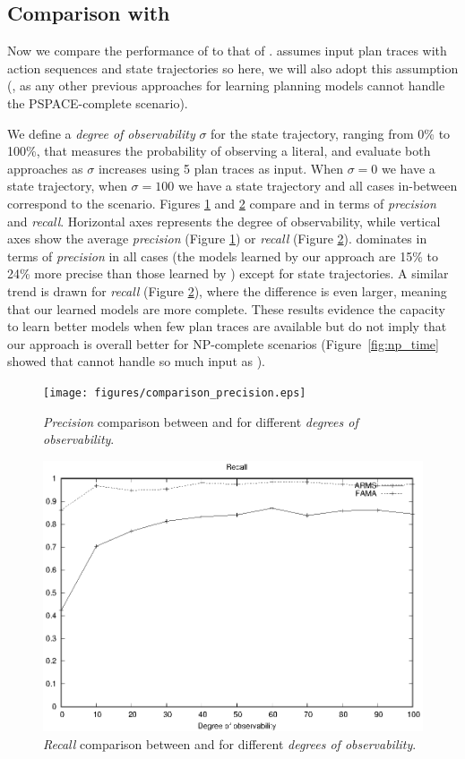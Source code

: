 \subsection{Comparison with \ARMS}
Now we compare the performance of \FAMA to that of \ARMS. \ARMS assumes input plan traces with \FO action sequences and \NO state trajectories so here, we will also adopt this assumption (\ARMS, as any other previous approaches for learning planning models cannot handle the PSPACE-complete scenario).

We define a \emph{degree of observability} $\sigma$ for the state trajectory, ranging from 0\% to 100\%, that measures the probability of observing a literal, and evaluate both approaches as $\sigma$ increases using 5 plan traces as input. When $\sigma = 0$ we have a \NO state trajectory, when $\sigma=100$ we have a \FO state trajectory and all cases in-between correspond to the \PO scenario. Figures \ref{fig:comparison_precision} and \ref{fig:comparison_recall} compare \FAMA and \ARMS in terms of {\em precision} and {\em recall}. Horizontal axes represents the degree of observability, while vertical axes show the average {\em precision} (Figure \ref{fig:comparison_precision}) or {\em recall} (Figure \ref{fig:comparison_recall}). \FAMA dominates in terms of {\em precision} in all cases (the models learned by our approach are 15\% to 24\% more precise than those learned by \ARMS) except for \FO state trajectories. A similar trend is drawn for {\em recall} (Figure \ref{fig:comparison_recall}), where the difference is even larger, meaning that our learned models are more complete. These results evidence the \FAMA capacity to learn better models when few plan traces are available but do not imply that our approach is overall better for NP-complete scenarios (Figure~\ref{fig:np_time} showed that \FAMA cannot handle so much input as \ARMS).



\begin{figure}[hbt!]
	\centering
	\texttt{[image: figures/comparison\_precision.eps]}
	\caption{{\em Precision} comparison between \FAMA and \ARMS for different \emph{degrees of observability}.}
	\label{fig:comparison_precision}
\end{figure}

\begin{figure}[hbt!]
	\centering
	\includegraphics[width=.65\linewidth]{figures/comparison_recall.eps}
	\caption{{\em Recall} comparison between \FAMA and \ARMS for different \emph{degrees of observability}.}
	\label{fig:comparison_recall}
\end{figure}



